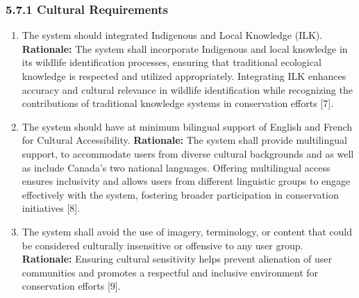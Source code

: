 \documentclass[]{article}
\begin{document}
\subsubsection*{5.7.1 Cultural Requirements}
\label{ssub:cultural_requirements}
\begin{enumerate}[{CP-C}1. ]
	\item The system should integrated Indigenous and Local Knowledge (ILK).
    \newline \textbf{Rationale:} The system shall incorporate Indigenous and local knowledge in its wildlife identification processes, ensuring that traditional ecological knowledge is respected and utilized appropriately. Integrating ILK enhances accuracy and cultural relevance in wildlife identification while recognizing the contributions of traditional knowledge systems in conservation efforts [7].

     \item The system should have at minimum bilingual support of English and French for Cultural Accessibility.
    \newline\textbf{Rationale:} The system shall provide multilingual support, to accommodate users from diverse cultural backgrounds and as well as include Canada's two national languages. Offering multilingual access ensures inclusivity and allows users from different linguistic groups to engage effectively with the system, fostering broader participation in conservation initiatives [8].
\item The system shall avoid the use of imagery, terminology, or content that could be considered culturally insensitive or offensive to any user group.
    \newline\textbf{Rationale:}  Ensuring cultural sensitivity helps prevent alienation of user communities and promotes a respectful and inclusive environment for conservation efforts [9].
\end{enumerate}
\end{document}

